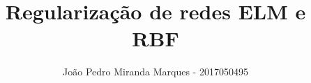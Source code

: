 \documentclass[10pt]{article}
\title{\LARGE \bf
Regularização de redes ELM e RBF 
}
\author{João Pedro Miranda Marques - 2017050495}
\begin{document}
\maketitle
\begin{multicols}{2}















\end{multicols}
\pagebreak
\printbibliography
\end{document}
